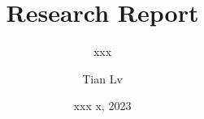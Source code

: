 \documentclass[11pt]{beamer}
\title{Research Report}
\subtitle{xxx}
\institute{Hunan university}
\author{Tian Lv}
\date{xxx x, 2023}
\begin{document}
 
\begin{frame}[plain] 
	\maketitle 
\end{frame} 


\end{document}
